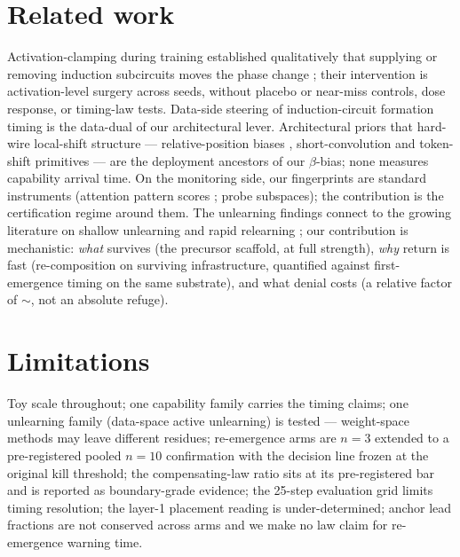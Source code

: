 \documentclass[11pt]{article}
\begin{document}
\section{Related work}
\label{sec:related}
Activation-clamping during training established qualitatively that supplying or
removing induction subcircuits moves the phase change \citep{singh2024needs}; their
intervention is activation-level surgery across seeds, without placebo or near-miss
controls, dose response, or timing-law tests. Data-side steering of induction-circuit
formation timing \citep{patterning2026} is the data-dual of our architectural lever.
Architectural priors that hard-wire local-shift structure --- relative-position
biases \citep{press2022alibi}, short-convolution and token-shift primitives
\citep{fu2023h3} --- are the deployment ancestors of our $\beta$-bias; none measures
capability arrival time. On the monitoring side, our fingerprints are standard
instruments (attention pattern scores \citep{olsson2022context}; probe subspaces);
the contribution is the certification regime around them. The unlearning findings
connect to the growing literature on shallow unlearning and rapid relearning
\citep{unlearningrobustness}; our contribution is mechanistic: \emph{what} survives
(the precursor scaffold, at full strength), \emph{why} return is fast (re-composition
on surviving infrastructure, quantified against first-emergence timing on the same
substrate), and what denial costs (a relative factor of $\sim$\RtwoBRatio, not an
absolute refuge).

\section{Limitations}
\label{sec:limits}
Toy scale throughout; one capability family carries the timing claims; one unlearning
family (data-space active unlearning) is tested --- weight-space methods may leave
different residues; re-emergence arms are $n{=}3$ extended to a pre-registered pooled
$n{=}10$ confirmation with the decision line frozen at the original kill threshold;
the compensating-law ratio sits at its pre-registered bar and is reported as
boundary-grade evidence; the 25-step evaluation grid limits timing resolution; the
layer-1 placement reading is under-determined; anchor lead fractions are not
conserved across arms and we make no law claim for re-emergence warning time.
\end{document}
